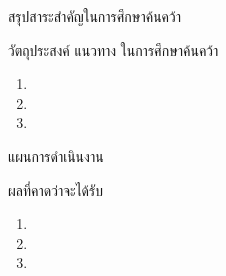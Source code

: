 \documentclass[a4paper,12pt]{article}
\begin{document}
\maketitle

\item สรุปสาระสำคัญในการศึกษาค้นคว้า

\vspace{3in}

\item
\ifsurvey%
วัตถุประสงค์%
\else%
แนวทาง%
\fi
ในการศึกษาค้นคว้า
\begin{enumerate}
\item
\item
\item
\end{enumerate}

\newpage

\item แผนการดำเนินงาน\\
\begin{plan}
\end{plan}

\ifproject
\item ผลที่คาดว่าจะได้รับ
\begin{enumerate}
\item
\item
\item
\end{enumerate}
\fi

\makefooter
\end{document}
